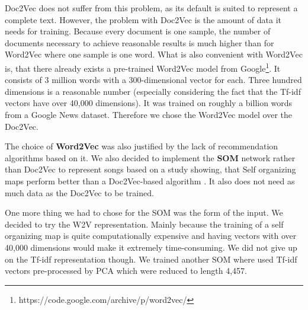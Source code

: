 Doc2Vec does not suffer from this problem, as its default is suited to represent a complete text. However, the problem with Doc2Vec is the amount of data it needs for training. Because every document is one sample, the number of documents necessary to achieve reasonable results is much higher than for Word2Vec where one sample is one word. What is also convenient with Word2Vec is, that there already exists a pre-trained Word2Vec model from Google\footnote{https://code.google.com/archive/p/word2vec/}. It consists of 3 million words with a 300-dimensional vector for each. Three hundred dimensions is a reasonable number (especially considering the fact that the Tf-idf vectors have over 40,000 dimensions). It was trained on roughly a billion words from a Google News dataset. Therefore we chose the Word2Vec model over the Doc2Vec.  

The choice of \textbf{Word2Vec} was also justified by the lack of recommendation algorithms based on it. We also decided to implement the \textbf{SOM} network rather than Doc2Vec to represent songs based on a study showing, that Self organizing maps perform better than a Doc2Vec-based algorithm \cite{inproceedings}. It also does not need as much data as the Doc2Vec to be trained. 

One more thing we had to chose for the SOM was the form of the input. We decided to try the W2V representation. Mainly because the training of a self organizing map is quite computationally expensive and having vectors with over 40,000 dimensions would make it extremely time-consuming. We did not give up on the Tf-idf representation though. We trained another SOM where used Tf-idf vectors pre-processed by PCA which were reduced to length 4,457. 

